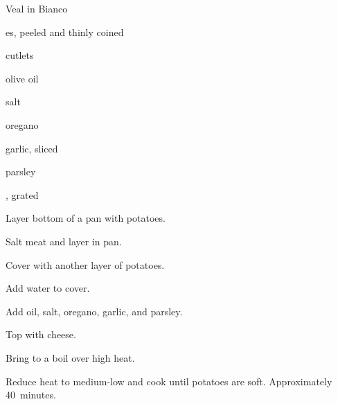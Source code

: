 \begin{recipe}{Veal in Bianco}{}{}

\begin{ingredients}
\item {}es, peeled and thinly coined
\item {} cutlets
\item olive oil
\item salt
\item oregano
\item garlic, sliced
\item parsley
\item {}, grated
\end{ingredients}

\begin{directions}
\item Layer bottom of a pan with potatoes.
\item Salt meat and layer in pan.
\item Cover with another layer of potatoes.
\item Add water to cover.
\item Add oil, salt, oregano, garlic, and parsley.
\item Top with cheese.
\item Bring to a boil over high heat.
\item Reduce heat to medium-low and cook until potatoes are soft. Approximately 40~minutes.
\end{directions}

\hint{}
\end{recipe}
